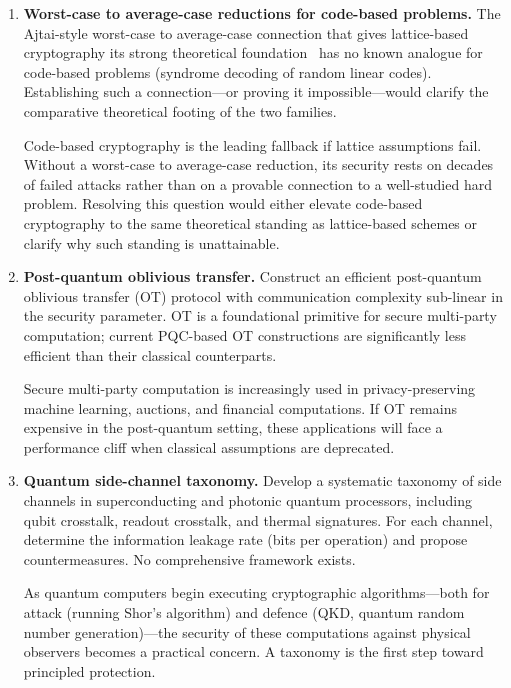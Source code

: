 \begin{enumerate}
Hybrid key exchange is the recommended deployment mode during the transition, but the overhead is poorly characterised.  Network operators need reliable models to plan capacity, and protocol designers need them to optimise handshake flows.

\item \textbf{Worst-case to average-case reductions for code-based problems.}
The Ajtai-style worst-case to average-case connection that gives lattice-based cryptography its strong theoretical foundation~\cite{MicciancioGoldwasser2002} has no known analogue for code-based problems (syndrome decoding of random linear codes).  Establishing such a connection---or proving it impossible---would clarify the comparative theoretical footing of the two families.

Code-based cryptography is the leading fallback if lattice assumptions fail.  Without a worst-case to average-case reduction, its security rests on decades of failed attacks rather than on a provable connection to a well-studied hard problem.  Resolving this question would either elevate code-based cryptography to the same theoretical standing as lattice-based schemes or clarify why such standing is unattainable.

\item \textbf{Post-quantum oblivious transfer.}
Construct an efficient post-quantum oblivious transfer (OT) protocol with communication complexity sub-linear in the security parameter.  OT is a foundational primitive for secure multi-party computation; current PQC-based OT constructions are significantly less efficient than their classical counterparts.

Secure multi-party computation is increasingly used in privacy-preserving machine learning, auctions, and financial computations.  If OT remains expensive in the post-quantum setting, these applications will face a performance cliff when classical assumptions are deprecated.

\item \textbf{Quantum side-channel taxonomy.}
Develop a systematic taxonomy of side channels in superconducting and photonic quantum processors, including qubit crosstalk, readout crosstalk, and thermal signatures.  For each channel, determine the information leakage rate (bits per operation) and propose countermeasures.  No comprehensive framework exists.

As quantum computers begin executing cryptographic algorithms---both for attack (running Shor's algorithm) and defence (QKD, quantum random number generation)---the security of these computations against physical observers becomes a practical concern.  A taxonomy is the first step toward principled protection.


\end{enumerate}
